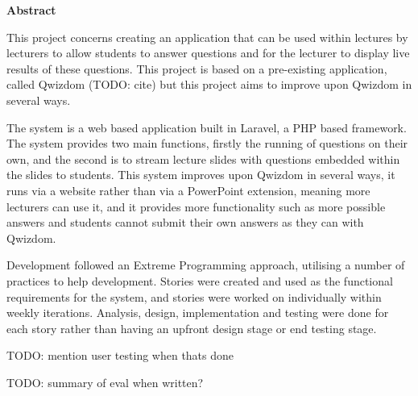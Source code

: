 \thispagestyle{empty}

\begin{center}
    {\LARGE\bf Abstract}
\end{center}

This project concerns creating an application that can be used within lectures by lecturers to allow students to answer questions and for the lecturer to display live results of these questions. This project is based on a pre-existing application, called Qwizdom (TODO: cite) but this project aims to improve upon Qwizdom in several ways.

The system is a web based application built in Laravel, a PHP based framework. The system provides two main functions, firstly the running of questions on their own, and the second is to stream lecture slides with questions embedded within the slides to students. This system improves upon Qwizdom in several ways, it runs via a website rather than via a PowerPoint extension, meaning more lecturers can use it, and it provides more functionality such as more possible answers and students cannot submit their own answers as they can with Qwizdom.

Development followed an Extreme Programming approach, utilising a number of practices to help development. Stories were created and used as the functional requirements for the system, and stories were worked on individually within weekly iterations. Analysis, design, implementation and testing were done for each story rather than having an upfront design stage or end testing stage.

TODO: mention user testing when thats done

TODO: summary of eval when written?